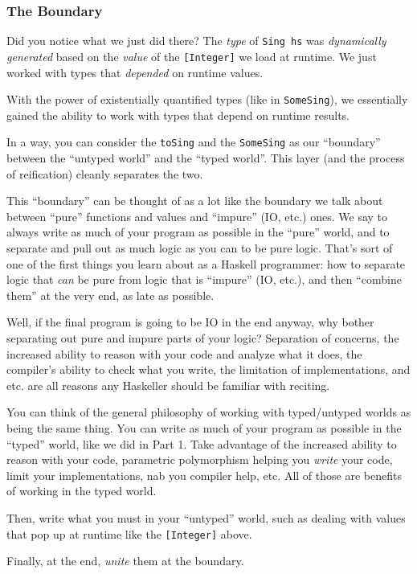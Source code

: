 \documentclass[]{article}
\begin{document}
\subsubsection{The Boundary}\label{the-boundary}

Did you notice what we just did there? The \emph{type} of \texttt{Sing\ hs} was
\emph{dynamically generated} based on the \emph{value} of the
\texttt{{[}Integer{]}} we load at runtime. We just worked with types that
\emph{depended} on runtime values.

With the power of existentially quantified types (like in \texttt{SomeSing}), we
essentially gained the ability to work with types that depend on runtime
results.

In a way, you can consider the \texttt{toSing} and the \texttt{SomeSing} as our
``boundary'' between the ``untyped world'' and the ``typed world''. This layer
(and the process of reification) cleanly separates the two.

This ``boundary'' can be thought of as a lot like the boundary we talk about
between ``pure'' functions and values and ``impure'' (IO, etc.) ones. We say to
always write as much of your program as possible in the ``pure'' world, and to
separate and pull out as much logic as you can to be pure logic. That's sort of
one of the first things you learn about as a Haskell programmer: how to separate
logic that \emph{can} be pure from logic that is ``impure'' (IO, etc.), and then
``combine them'' at the very end, as late as possible.

Well, if the final program is going to be IO in the end anyway, why bother
separating out pure and impure parts of your logic? Separation of concerns, the
increased ability to reason with your code and analyze what it does, the
compiler's ability to check what you write, the limitation of implementations,
and etc. are all reasons any Haskeller should be familiar with reciting.

You can think of the general philosophy of working with typed/untyped worlds as
being the same thing. You can write as much of your program as possible in the
``typed'' world, like we did in Part 1. Take advantage of the increased ability
to reason with your code, parametric polymorphism helping you \emph{write} your
code, limit your implementations, nab you compiler help, etc. All of those are
benefits of working in the typed world.

Then, write what you must in your ``untyped'' world, such as dealing with values
that pop up at runtime like the \texttt{{[}Integer{]}} above.

Finally, at the end, \emph{unite} them at the boundary.
\end{document}
